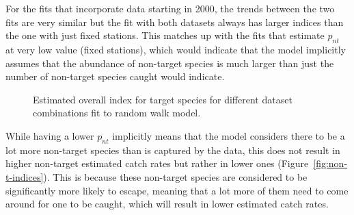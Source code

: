 \documentclass[12pt]{article}\usepackage[]{graphicx}\usepackage[]{color}
\begin{document}
For the fits that incorporate data starting in 2000, the trends between the two fits are very similar but the fit with both datasets always has larger indices than the one with just fixed stations. This matches up with the fits that estimate \(p_{nt}\) at very low value (fixed stations), which would indicate that the model implicitly assumes that the abundance of non-target species is much larger than just the number of non-target species caught would indicate.
\begin{figure}[htb]

{\centering {}  

}

\caption{Estimated overall index for target species for different dataset combinations fit to random walk model.}\label{fig:target-indices}
\end{figure}
While having a lower \(p_{nt}\) implicitly means that the model considers there to be a lot more non-target species than is captured by the data, this does not result in higher non-target estimated catch rates but rather in lower ones (Figure~\ref{fig:non-t-indices}). This is because these non-target species are considered to be significantly more likely to escape, meaning that a lot more of them need to come around for one to be caught, which will result in lower estimated catch rates.
\end{document}

